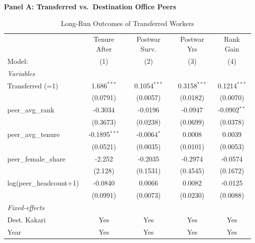 \begin{table}[p]
\centering
\caption{Long-Run Outcomes of Transferred Workers}
\label{tab:transfer-outcomes}
\begin{threeparttable}
\tiny

\textbf{Panel A: Transferred vs.\ Destination Office Peers}
\smallskip

\begin{tabular}{lcccc}
   \tabularnewline \midrule \midrule
                                  & Tenure After    & Postwar Surv.      & Postwar Yrs     & Rank Gain \\   
   Model:                         & (1)             & (2)                & (3)             & (4)\\  
   \midrule
   \emph{Variables}\\
   Transferred (=1)               & 1.686$^{***}$   & 0.1054$^{***}$     & 0.3158$^{***}$  & 0.1214$^{***}$\\   
                                  & (0.0791)        & (0.0057)           & (0.0182)        & (0.0070)\\   
   peer\_avg\_rank                & -0.3034         & -0.0196            & -0.0947         & -0.0902$^{**}$\\   
                                  & (0.3673)        & (0.0238)           & (0.0699)        & (0.0378)\\   
   peer\_avg\_tenure              & -0.1895$^{***}$ & -0.0064$^{*}$      & 0.0008          & 0.0039\\   
                                  & (0.0521)        & (0.0035)           & (0.0101)        & (0.0053)\\   
   peer\_female\_share            & -2.252          & -0.2035            & -0.2974         & -0.0574\\   
                                  & (2.128)         & (0.1531)           & (0.4545)        & (0.1672)\\   
   log(peer\_headcount+1)         & -0.0840         & 0.0066             & 0.0082          & -0.0125\\   
                                  & (0.0991)        & (0.0073)           & (0.0230)        & (0.0088)\\   
   \midrule
   \emph{Fixed-effects}\\
   Dest. Kakari                   & Yes             & Yes                & Yes             & Yes\\  
   Year                           & Yes             & Yes                & Yes             & Yes\\  

\end{tabular}
\end{threeparttable}
\end{table}
